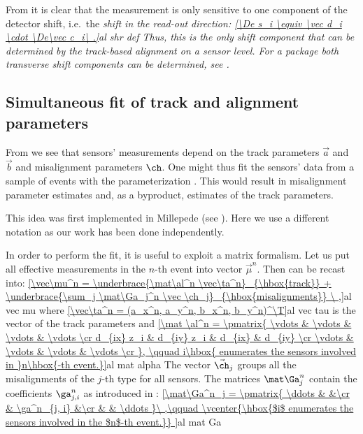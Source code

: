 
From  it is clear that the measurement is only sensitive to one component of the detector shift, i.e.~the \em{shift in the read-out direction}:
\eqref{\De s_i \equiv \vec d_i \cdot \De\vec c_i\ .}{al shr def}
Thus, this is the only shift component that can be determined by the track-based alignment on a sensor level. For a  package both transverse shift components can be determined, see .


\subsection[al sim fit]{Simultaneous fit of track and alignment parameters}

From  we see that sensors' measurements depend on the track parameters $\vec a$ and $\vec b$ and misalignment parameters $\ch$. One might thus fit the sensors' data from a sample of events with the parameterization . This would result in misalignment parameter estimates and, as a byproduct, estimates of the track parameters.

This idea was first implemented in Millepede (see ). Here we use a different notation as our work has been done independently.

In order to perform the fit, it is useful to exploit a matrix formalism. Let us put all effective measurements in the $n$-th event into vector $\vec\mu^n$. Then  can be recast into:
\eqref{\vec\mu^n =
	\underbrace{\mat\al^n \vec\ta^n}_{\hbox{track}}
	+
	\underbrace{\sum_j \mat\Ga_j^n \vec \ch_j}_{\hbox{misalignments}}
\ ,}{al vec mu}
where
\eqref{\vec\ta^n = (a_x^n, a_y^n, b_x^n, b_y^n)^\T}{al vec tau}
is the vector of the track parameters and 
\eqref{\mat \al^n = \pmatrix{
	\vdots		& \vdots		& \vdots	& \vdots \cr
	d_{ix} z_i	& d_{iy} z_i	& d_{ix}	& d_{iy} \cr
	\vdots		& \vdots		& \vdots	& \vdots \cr
}, \qquad i\hbox{ enumerates the sensors involved in }n\hbox{-th event.}}{al mat alpha}
The vector $\vec\ch_j$ groups all the misalignments of the $j$-th type for all sensors. The matrices $\mat\Ga_j^n$ contain the coefficients $\ga^n_{j,i}$ as introduced in :
\eqref{\mat\Ga^n_j = \pmatrix{
		\ddots	&				&\cr
				& \ga^n_{j, i}	&\cr
				&				& \ddots
	}\ ,\qquad
	\vcenter{\hbox{$i$ enumerates the sensors involved in the $n$-th event.}}
}{al mat Ga}


